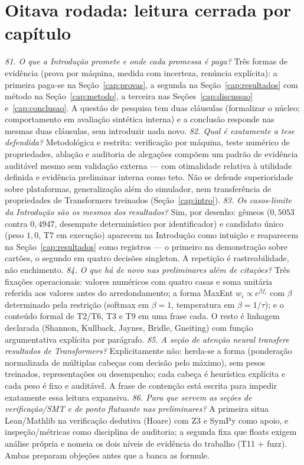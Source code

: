 \section{Oitava rodada: leitura cerrada por capítulo}
\textit{81. O que a Introdução promete e onde cada promessa é paga?} Três formas de evidência (prova por máquina, medida com incerteza, renúncia explícita): a primeira paga-se na Seção~\ref{cap:provas}, a segunda na Seção~\ref{cap:resultados} com método na Seção~\ref{cap:metodo}, a terceira nas Seções~\ref{cap:discussao} e~\ref{cap:conclusao}. A questão de pesquisa tem duas cláusulas (formalizar o núcleo; comportamento em avaliação sintética interna) e a conclusão responde nas mesmas duas cláusulas, sem introduzir nada novo.
\textit{82. Qual é exatamente a tese defendida?} Metodológica e restrita: verificação por máquina, teste numérico de propriedades, ablação e auditoria de alegações compõem um padrão de evidência auditável mesmo sem validação externa --- com otimalidade relativa à utilidade definida e evidência preliminar interna como teto. Não se defende superioridade sobre plataformas, generalização além do simulador, nem transferência de propriedades de Transformers treinados (Seção~\ref{cap:intro}).
\textit{83. Os casos-limite da Introdução são os mesmos dos resultados?} Sim, por desenho: gêmeos ($0{,}5053$ contra $0{,}4947$, desempate determinístico por identificador) e candidato único (peso $1{,}0$, T7 em execução) aparecem na Introdução como intuição e reaparecem na Seção~\ref{cap:resultados} como registros --- o primeiro na demonstração sobre cartões, o segundo em quatro decisões singleton. A repetição é rastreabilidade, não enchimento.
\textit{84. O que há de novo nas preliminares além de citações?} Três fixações operacionais: valores numéricos com quatro casas e soma unitária referida aos valores antes do arredondamento; a forma MaxEnt $w_i\propto e^{\beta f_i}$ com $\beta$ determinado pela restrição (softmax em $\beta=1$, temperatura em $\beta=1/\tau$); e o conteúdo formal de T2/T6, T3 e T9 em uma frase cada. O resto é linhagem declarada (Shannon, Kullback, Jaynes, Bridle, Gneiting) com função argumentativa explícita por parágrafo.
\textit{85. A seção de atenção neural transfere resultados de Transformers?} Explicitamente não: herda-se a forma (ponderação normalizada de múltiplas cabeças com decisão pelo máximo), sem pesos treinados, representações ou desempenho; cada cabeça é heurística explícita e cada peso é fixo e auditável. A frase de contenção está escrita para impedir exatamente essa leitura expansiva.
\textit{86. Para que servem as seções de verificação/SMT e de ponto flutuante nas preliminares?} A primeira situa Lean/Mathlib na verificação dedutiva (Hoare) com Z3 e SymPy como apoio, e inspeção/métricas como disciplina de auditoria; a segunda fixa que floats exigem análise própria e nomeia os dois níveis de evidência do trabalho (T11 + fuzz). Ambas preparam objeções antes que a banca as formule.
